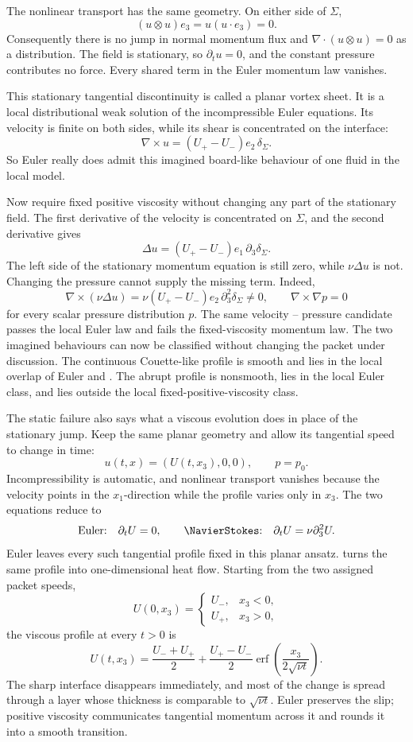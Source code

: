The nonlinear transport has the same geometry.
On either side of \(\Sigma\),
\[
  (u\otimes u)e_3
  =
  u(u\cdot e_3)
  =0.
\]
Consequently there is no jump in normal momentum flux and \(\nabla\cdot(u\otimes u)=0\) as a distribution.
The field is stationary, so \(\partial_tu=0\), and the constant pressure contributes no force.
Every shared term in the Euler momentum law vanishes.

This stationary tangential discontinuity is called a planar vortex sheet.
It is a local distributional weak solution of the incompressible Euler equations.
Its velocity is finite on both sides, while its shear is concentrated on the interface:
\[
  \nabla\times u
  =
  (U_+-U_-)e_2\,\delta_\Sigma.
\]
So Euler really does admit this imagined board-like behaviour of one fluid in the local model.

Now require fixed positive viscosity without changing any part of the stationary field.
The first derivative of the velocity is concentrated on \(\Sigma\), and the second derivative gives
\[
  \Delta u
  =
  (U_+-U_-)e_1\,\partial_3\delta_\Sigma.
\]
The left side of the stationary momentum equation is still zero, while \(\nu\Delta u\) is not.
Changing the pressure cannot supply the missing term.
Indeed,
\[
  \nabla\times(\nu\Delta u)
  =
  \nu(U_+-U_-)e_2\,\partial_3^2\delta_\Sigma
  \neq0,
  \qquad
  \nabla\times\nabla p=0
\]
for every scalar pressure distribution \(p\).
The same velocity -- pressure candidate passes the local Euler law and fails the fixed-viscosity \NavierStokes{} momentum law.
The two imagined behaviours can now be classified without changing the packet under discussion.
The continuous Couette-like profile is smooth and lies in the local overlap of Euler and \NavierStokes{}.
The abrupt profile is nonsmooth, lies in the local Euler class, and lies outside the local fixed-positive-viscosity \NavierStokes{} class.

The static failure also says what a viscous evolution does in place of the stationary jump.
Keep the same planar geometry and allow its tangential speed to change in time:
\[
  u(t,x)=(U(t,x_3),0,0),
  \qquad
  p=p_0.
\]
Incompressibility is automatic, and nonlinear transport vanishes because the velocity points in the \(x_1\)-direction while the profile varies only in \(x_3\).
The two equations reduce to
\[
  \text{Euler:}\quad \partial_tU=0,
  \qquad
  \text{\NavierStokes:}\quad \partial_tU=\nu\partial_3^2U.
\]
Euler leaves every such tangential profile fixed in this planar ansatz.
\NavierStokes{} turns the same profile into one-dimensional heat flow.
Starting from the two assigned packet speeds,
\[
  U(0,x_3)=
  \begin{cases}
    U_-, & x_3<0,\\
    U_+, & x_3>0,
  \end{cases}
\]
the viscous profile at every \(t>0\) is
\[
  U(t,x_3)
  =
  \frac{U_-+U_+}{2}
  +
  \frac{U_+-U_-}{2}
  \operatorname{erf}\!\left(\frac{x_3}{2\sqrt{\nu t}}\right).
\]
The sharp interface disappears immediately, and most of the change is spread through a layer whose thickness is comparable to \(\sqrt{\nu t}\).
Euler preserves the slip; positive viscosity communicates tangential momentum across it and rounds it into a smooth transition.

